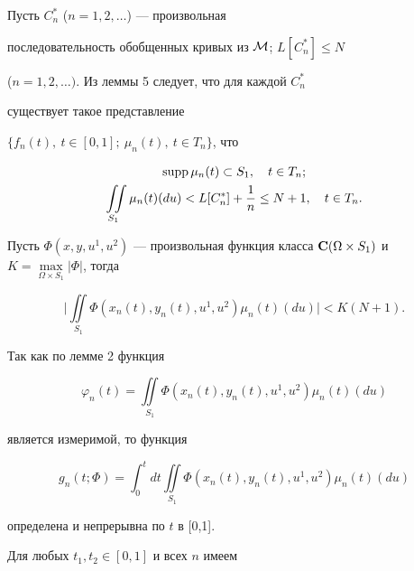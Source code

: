 \begin{pf}


Пусть $C^*_n$ ($n=1,2,\dotsc$) --- произвольная


последовательность обобщенных кривых из ${\cal M}$; $L[C^*_n] \leq N$


($n=1,2,\dotsc)$. Из леммы 5 следует, что для каждой $C^*_n$


существует такое представление


$\{f_n(t),\ t\in [0,1];\ \mu_n(t),\ t\in T_n\}$, что


\begin{gather}


\supp\mu_n(t)\subset S_1,\quad t\in T_n;\notag \\


%


\iint\limits_{S_1}


\mu_n(t)(du)<L[C^*_n]+\frac{1}{n} \leq N+1,\quad t\in T_n.


\end{gather}





Пусть $\Phi(x,y,u^1,u^2)$ --- произвольная функция класса ${\bold{C}}(\Omega


\times S_1)$ и $K=\max\limits_{\Omega \times S_1}|\Phi|$, тогда


$$


\bigg|


\iint\limits_{S_1} \Phi(x_n(t),y_n(t), u^1,u^2)\mu_n(t)(du)\bigg|<K(N+1).


$$





Так как по лемме 2 функция


$$


\varphi_n(t)= \iint\limits_{S_1}


\Phi(x_n(t),y_n(t), u^1,u^2)\mu_n(t)(du)


$$


является измеримой, то функция


$$


g_n(t;\Phi)= \int_{0}^{t} dt \iint\limits_{S_1} \Phi(x_n(t),y_n(t),


u^1,u^2)\mu_n(t)(du)


$$


определена и непрерывна по $t$ в [0,1].





Для любых $t_1,t_2\in[0,1]$ и всех $n$ имеем



\end{pf}
